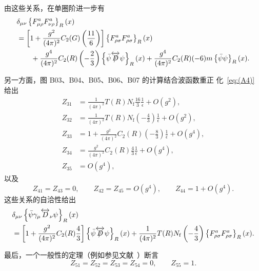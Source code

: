 由这些关系，在单圈阶进一步有
\begin{align}
   &\delta_{\mu\nu}\left\{F_{\mu\rho}^aF_{\nu\rho}^a\right\}_R(x)
\notag\\
   &=\left[
   1+\frac{g^2}{(4\pi)^2}C_2(G)\left(\frac{11}{6}\right)\right]
   \left\{F_{\rho\sigma}^aF_{\rho\sigma}^a\right\}_R(x)
\notag\\
   &\qquad{}
   +\frac{g^4}{(4\pi)^2}C_2(R)\left(-\frac{2}{3}\right)
   \left\{\Bar{\psi}\overleftrightarrow{\Slash{D}}\psi\right\}_R(x)
   +\frac{g^4}{(4\pi)^2}C_2(R)(-6)
   m\left\{\Bar{\psi}\psi\right\}_R(x).
\label{eq:(A21)}
\end{align}

另一方面，图 B03、B04、B05、B06、B07 的计算结合波函数重正
化~\eqref{eq:(A4)} 给出
\begin{align}
   Z_{31}
   &=\frac{1}{(4\pi)^2}T(R)N_{\mathrm{f}}
   \frac{16}{3}
   \frac{1}{\epsilon}+O(g^2),
\label{eq:(A22)}\\
   Z_{32}
   &=\frac{1}{(4\pi)^2}T(R)N_{\mathrm{f}}
   \left(-\frac{4}{3}\right)
   \frac{1}{\epsilon}+O(g^2),
\label{eq:(A23)}\\
   Z_{33}
   &=1+\frac{g^2}{(4\pi)^2}C_2(R)\left(-\frac{8}{3}\right)\frac{1}{\epsilon}
   +O(g^4),
\label{eq:(A24)}\\
   Z_{34}
   &=\frac{g^2}{(4\pi)^2}C_2(R)\frac{4}{3}\frac{1}{\epsilon}
   +O(g^4),
\label{eq:(A25)}\\
   Z_{35}
   &=O(g^4),
\label{eq:(A26)}
\end{align}
以及
\begin{equation}
   Z_{41}=Z_{43}=0,\qquad Z_{42}=Z_{45}=O(g^4),\qquad Z_{44}=1+O(g^4).
\label{eq:(A27)}
\end{equation}
这些关系的自洽性给出
\begin{align}
   &\delta_{\mu\nu}\left\{\Bar{\psi}\gamma_\mu\overleftrightarrow{D}_\nu
   \psi\right\}_R(x)
\notag\\
   &=\left[1+\frac{g^2}{(4\pi)^2}C_2(R)\frac{4}{3}\right]
   \left\{\Bar{\psi}\overleftrightarrow{\Slash{D}}
   \psi\right\}_R(x)
   +\frac{1}{(4\pi)^2}T(R)N_{\mathrm{f}}\left(-\frac{4}{3}\right)
   \left\{F_{\rho\sigma}^aF_{\rho\sigma}^a\right\}_R(x).
\label{eq:(A28)}
\end{align}

最后，一个一般性的定理（例如参见文献~\cite{Collins:1984xc}）断言
\begin{equation}
   Z_{51}=Z_{52}=Z_{53}=Z_{54}=0,\qquad Z_{55}=1.
\label{eq:(A29)}
\end{equation}


